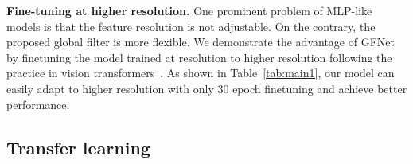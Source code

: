 \documentclass{article}
\numberwithin{equation}{section}
\newcommand{\paragrapha}[2][1pt]{\vspace{#1}\noindent\textbf{#2}}
\begin{document}
\paragrapha{Fine-tuning at higher resolution.} One prominent problem of MLP-like models is that the feature resolution is not adjustable. On the contrary, the proposed global filter is more flexible. We demonstrate the advantage of GFNet by finetuning the model trained at  resolution to higher resolution following the practice in vision transformers~\cite{touvron2020deit}. As shown in Table~\ref{tab:main1}, our model can easily adapt to higher resolution with only 30 epoch finetuning and achieve better performance. 


\begin{table}[htbp]
  \centering
  \caption{\textbf{Results on transfer learning datasets}. We report the top-1 accuracy on the four datasets as well as the number of parameters and FLOPs. } \vspace{5pt}
   \vspace{-5pt}
  \label{tab:transfer}\end{table}


\subsection{Transfer learning}
\end{document}
